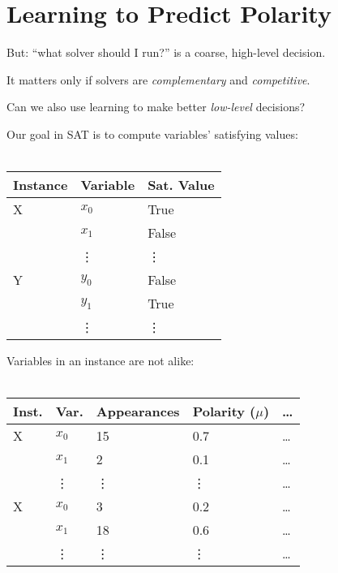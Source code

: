 \section{Learning to Predict Polarity}

\begin{frame}
But: ``what solver should I run?'' is a coarse, high-level decision.
\end{frame}

\begin{frame}
It matters only if solvers are \emph{complementary} and \emph{competitive}.
\end{frame}

\begin{frame}
Can we also use learning to make better \emph{low-level} decisions?
\end{frame}

\begin{frame}
Our goal in SAT is to compute variables' satisfying values:
\ \\
\ \\
\begin{center}
\begin{tabular}{lll}
\toprule
{\bf Instance} & {\bf Variable} & {\bf Sat. Value}\\
\midrule
X & $x_0$ & True\\
  & $x_1$ & False\\
  & \vdots & \vdots\\
Y & $y_0$ & False\\
  & $y_1$ & True\\
  & \vdots & \vdots\\
\bottomrule
\end{tabular}
\end{center}
\end{frame}

\begin{frame}
Variables in an instance are not alike:
\ \\
\ \\
\begin{center}
\begin{tabular}{lllll}
\toprule
{\bf Inst.} & {\bf Var.} & {\bf Appearances} & {\bf Polarity ($\mu$)} & {\bf \dots}\\
\midrule
X & $x_0$ & 15 & 0.7 & \dots\\
  & $x_1$ & 2 & 0.1 & \dots\\
  & \vdots & \vdots & \vdots & \dots\\
X & $x_0$ & 3 & 0.2 & \dots\\
  & $x_1$ & 18 & 0.6 & \dots\\
  & \vdots & \vdots & \vdots & \dots\\
\bottomrule
\end{tabular}
\end{center}
\end{frame}

